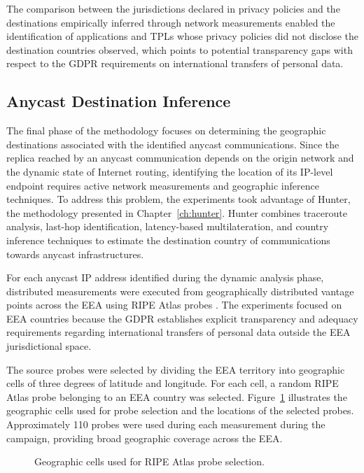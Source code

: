 The comparison between the jurisdictions declared in privacy policies and the destinations empirically inferred through network measurements enabled the identification of applications and TPLs whose privacy policies did not disclose the destination countries observed, which points to potential transparency gaps with respect to the GDPR requirements on international transfers of personal data.

\subsection{Anycast Destination Inference}
\label{sc:anycast_experiments_hunter_integration}

The final phase of the methodology focuses on determining the geographic destinations associated with the identified anycast communications. Since the replica reached by an anycast communication depends on the origin network and the dynamic state of Internet routing, identifying the location of its IP-level endpoint requires active network measurements and geographic inference techniques. To address this problem, the experiments took advantage of Hunter, the methodology presented in Chapter~\ref{ch:hunter}. Hunter combines traceroute analysis, last-hop identification, latency-based multilateration, and country inference techniques to estimate the destination country of communications towards anycast infrastructures.

For each anycast IP address identified during the dynamic analysis phase, distributed measurements were executed from geographically distributed vantage points across the EEA using RIPE Atlas probes \cite{HomeAtlas}. The experiments focused on EEA countries because the GDPR establishes explicit transparency and adequacy requirements regarding international transfers of personal data outside the EEA jurisdictional space.

The source probes were selected by dividing the EEA territory into geographic cells of three degrees of latitude and longitude. For each cell, a random RIPE Atlas probe belonging to an EEA country was selected. Figure~\ref{fig:ripe_atlas_eea_mesh_cells} illustrates the geographic cells used for probe selection and the locations of the selected probes. Approximately 110 probes were used during each measurement during the campaign, providing broad geographic coverage across the EEA.

\begin{figure}[ht]
    \centering
    
    \caption{Geographic cells used for RIPE Atlas probe selection.}
    \label{fig:ripe_atlas_eea_mesh_cells}
\end{figure}

